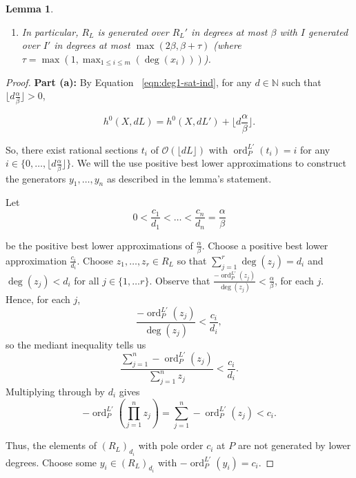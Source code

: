 \documentclass{amsart}
\theoremstyle{plain}
\newtheorem{lem}[thm]{Lemma}
\theoremstyle{definition}
\theoremstyle{remark}
\numberwithin{equation}{section}
\newcommand\BN{{\mathbb N}}
\newcommand\sco{{\mathscr O}}
\DeclareMathOperator{\ord}{ord}
\newcommand{\halfcan}{L}
\begin{document}
\begin{lem}
\begin{enumerate}
\item[(c)] In particular, $R_\halfcan$ is generated over $R_\halfcan'$
	in degrees at most $\beta$ with $I$ generated over $I'$ in
	degrees at most $\max(2 \beta, \beta + \tau)$ (where $\tau = \max(1,
	\max_{1 \leq i \leq m}(\deg(x_i)))$).
\end{enumerate}
\end{lem}

\begin{proof}
{\bf Part (a):}
By
Equation ~\ref{eqn:deg1-sat-ind}, for any $d
\in \BN$ such that $\lfloor d \frac{ \alpha}{\beta} \rfloor > 0$,

\[
	h^0 (X, d \halfcan ) = h^0(X, d\halfcan') + \lfloor d\frac{\alpha}{\beta}\rfloor.
\]

\noindent
So,  there exist rational sections $t_i$ of $\sco(\lfloor d\halfcan \rfloor)$ with $\ord_P^{L'}(t_i) = i$
for any $i \in \{0, \ldots, \lfloor d \frac{\alpha}{
\beta} \rfloor \}$. We will the use positive best lower approximations to
construct the generators $y_1, \ldots, y_n$ as described in the lemma's statement.

Let 
\[
	0 < \frac{c_1}{d_1} < \ldots < \frac{c_n}{d_n} = \frac{\alpha}{
	\beta}
\]

\noindent
be the positive best lower approximations of $\frac{
\alpha}{\beta}$. 
Choose a positive best lower approximation $\frac{c_i}{d_i}$.  Choose $z_1, \ldots, z_r \in R_\halfcan$ so that $\sum_{j=1}^r \deg(z_j) = d_i$ and $\deg(z_j)<d_i$ for all $j\in \{1, \ldots r\}$. Observe that $\frac{-\ord_P^{\halfcan'}(z_j)}{\deg(z_j)}< \frac{\alpha}{\beta}$, for each $j$.  Hence, for each $j$, 
\[
	\frac{-\ord_P^{\halfcan'}(z_j)}{\deg(z_j)} < \frac{c_i}{d_i},
\]
so the mediant inequality tells us
\[
	\frac{\sum_{j=1}^n -\ord^{\halfcan'}_P(z_j)}{\sum_{j=1}^n z_j } < \frac{c_i}{d_i}.
\]
Multiplying through by $d_i$ gives
\[
	-\ord^{\halfcan'}_P \left(\prod_{j=1}^n z_j \right) = \sum_{j=1}^n -\ord^{\halfcan'}_P(z_j) < c_i .
\]

\noindent
Thus, the elements of $(R_{\halfcan})_{d_i}$ with pole order $c_i$ at $P$ are not generated by 
lower degrees. 
Choose some $y_i \in(R_{
\halfcan})_{d_i}$ with $-\ord_{P}^{L'}(y_i)=c_i$.


\end{proof}
\end{document}
